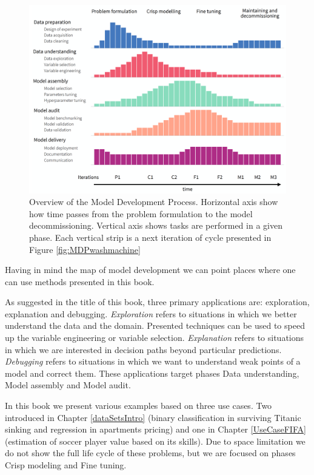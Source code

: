 \documentclass[12pt,]{krantz}
\begin{document}
\begin{figure}

{\centering \includegraphics[width=0.99\linewidth]{figure/mdp_general} 

}

\caption{Overview of the Model Development Process. Horizontal axis show how time passes from the problem formulation to the model decommissioning. Vertical axis shows tasks are performed in a given phase. Each vertical strip is a next iteration of cycle presented in Figure \ref{fig:MDPwashmachine}}\label{fig:mdpGeneral}
\end{figure}

Having in mind the map of model development we can point places where one can use methods presented in this book.

As suggested in the title of this book, three primary applications are: exploration, explanation and debugging. \emph{Exploration} refers to situations in which we better understand the data and the domain. Presented techniques can be used to speed up the variable engineering or variable selection. \emph{Explanation} refers to situations in which we are interested in decision paths beyond particular predictions. \emph{Debugging} refers to situations in which we want to understand weak points of a model and correct them. These applications target phases Data understanding, Model assembly and Model audit.

In this book we present various examples based on three use cases. Two introduced in Chapter \ref{dataSetsIntro} (binary classification in surviving Titanic sinking and regression in apartments pricing) and one in Chapter \ref{UseCaseFIFA} (estimation of soccer player value based on its skills). Due to space limitation we do not show the full life cycle of these problems, but we are focused on phases Crisp modeling and Fine tuning.
\end{document}
